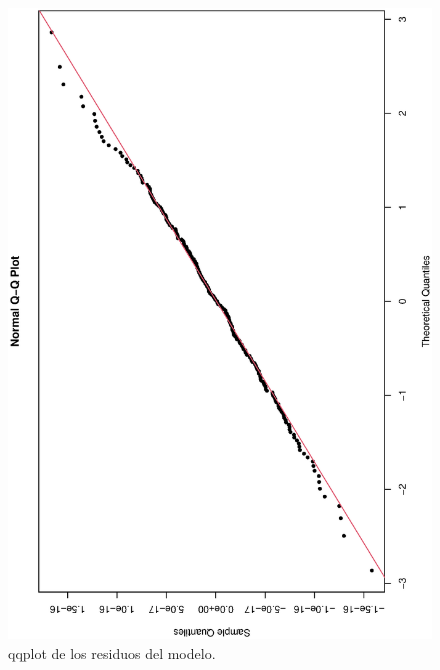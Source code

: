 \begin{figure}[h]
\begin{minipage}{0.45\textwidth}
    \includegraphics[width=0.8\linewidth,angle = 270]{Kap3/Fig_Cap3/agn_qqplot.eps}
    \caption{qqplot de los residuos del modelo.}
    \label{fig:example_agn_loess_qqplot}
    \end{minipage}


\end{figure}
